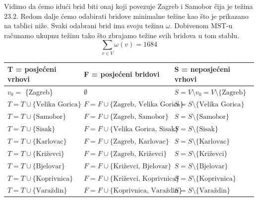 \documentclass[10pt]{scrartcl}
\begin{document}
Vidimo da ćemo idući brid biti onaj koji povezuje Zagreb i Samobor čija je težina $23.2$. Redom dalje ćemo odabirati bridove minimalne težine kao što je prikazano na tablici niže. Svaki odabrani brid ima svoju težinu $\omega$. Dobivenom MST-u računamo ukupnu težinu tako što zbrajamo težine svih bridova u tom stablu.
\begin{equation}
    \sum_{v \in V} \omega(v) = 1684
\end{equation}
\newline
\begin{table}[H]
\centering
\begin{tabular}{|l|l|l|} 
\hline
\textbf{T = posjećeni vrhovi}          & \textbf{F = posjećeni bridovi}                        & \textbf{S = neposjećeni vrhovi}                        \\ 
\hline
$v_0=$ \{Zagreb\}                      & $\emptyset$                                           & $S = V \setminus v_0 = V \setminus \{\text{Zagreb}\}$  \\ 
\hline
$T = T \cup \{\text{Velika Gorica}\}$  & $F = F \cup \{\text{Zagreb, Velika Gorica}\}$         & $S = S \setminus \{\text{Velika Gorica}\}$             \\ 
\hline
$T = T \cup \{\text{Samobor}\}$        & $F = F \cup \{\text{Zagreb, Samobor}\}$               & $S = S \setminus \{\text{Samobor}\}$                   \\ 
\hline
$T = T \cup \{\text{Sisak}\}$          & $F = F \cup \{\text{Velika Gorica, Sisak}\}$          & $S = S \setminus \{\text{Sisak}\}$                     \\ 
\hline
$T = T \cup \{\text{Karlovac}\}$       & $F = F \cup \{\text{Zagreb, Karlovac}\}$              & $S = S \setminus \{\text{Karlovac}\}$                  \\ 
\hline
$T = T \cup \{\text{Križevci}\}$       & $F = F \cup \{\text{Zagreb, Križevci}\}$              & $S = S \setminus \{\text{Križevci}\}$                  \\ 
\hline
$T = T \cup \{\text{Bjelovar}\}$       & $F = F \cup \{\text{Križevci, Bjelovar}\}$            & $S = S \setminus \{\text{Bjelovar}\}$                  \\ 
\hline
$T = T \cup \{\text{Koprivnica}\}$     & $F = F \cup \{\text{Križevci, Koprivnica}\}$          & $S = S \setminus \{\text{Koprivnica}\}$                \\ 
\hline
$T = T \cup \{\text{Varaždin}\}$       & $F = F \cup \{\text{Koprivnica, Varaždin}\}$          & $S = S \setminus \{\text{Varaždin}\}$                  \\ 

\end{tabular}
\end{table}
\end{document}
